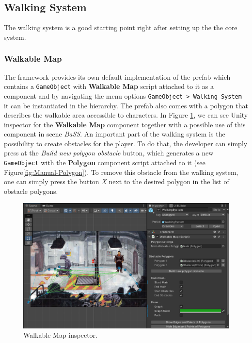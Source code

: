 \subsection{Walking System}
\label{Manual:WS}
The walking system is a good starting point right after setting up the the core system. 

\subsubsection{Walkable Map}
\label{Manual:WM}
The framework provides its own default implementation of the prefab which contains a \verb|GameObject| with \textbf{Walkable Map} script attached to it as a component and by navigating the menu options \verb|GameObject > Walking System| it can be instantiated in the hierarchy. The prefab also comes with a polygon that describes the walkable area accessible to characters. In Figure \ref{fig:Manual-WM}, we can see Unity inspector for the \textbf{Walkable Map} component together with a possible use of this component in scene \textit{BaSS}. An important part of the walking system is the possibility to create obstacles for the player. To do that, the developer can simply press at the \textit{Build new polygon obstacle} button, which generates a new \verb|GameObject| with the \textbf{Polygon} component script attached to it (see Figure\ref{fig:Manual-Polygon}). To remove this obstacle from the walking system, one can simply press the button \textit{X} next to the desired polygon in the list of obstacle polygons. 

\begin{figure}[H]
\centering
\includegraphics[width=1\linewidth]{img/User doc/walkable_map.png}
\caption{Walkable Map inspector.}
\label{fig:Manual-WM}
\end{figure}

